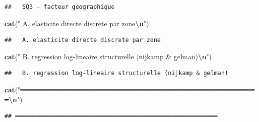 \documentclass[
]{article}
\newenvironment{Shaded}{\begin{snugshade}}{\end{snugshade}}
\newcommand{\FunctionTok}[1]{\textcolor[rgb]{0.13,0.29,0.53}{\textbf{#1}}}
\newcommand{\NormalTok}[1]{#1}
\newcommand{\SpecialCharTok}[1]{\textcolor[rgb]{0.81,0.36,0.00}{\textbf{#1}}}
\newcommand{\StringTok}[1]{\textcolor[rgb]{0.31,0.60,0.02}{#1}}
\begin{document}
\begin{verbatim}
##   SQ3 - facteur geographique
\end{verbatim}

\begin{Shaded}
\begin{Highlighting}[]
\FunctionTok{cat}\NormalTok{(}\StringTok{"  A. elasticite directe discrete par zone}\SpecialCharTok{\textbackslash{}n}\StringTok{"}\NormalTok{)}
\end{Highlighting}
\end{Shaded}

\begin{verbatim}
##   A. elasticite directe discrete par zone
\end{verbatim}

\begin{Shaded}
\begin{Highlighting}[]
\FunctionTok{cat}\NormalTok{(}\StringTok{"  B. regression log{-}lineaire structurelle (nijkamp \& gelman)}\SpecialCharTok{\textbackslash{}n}\StringTok{"}\NormalTok{)}
\end{Highlighting}
\end{Shaded}

\begin{verbatim}
##   B. regression log-lineaire structurelle (nijkamp & gelman)
\end{verbatim}

\begin{Shaded}
\begin{Highlighting}[]
\FunctionTok{cat}\NormalTok{(}\StringTok{"━━━━━━━━━━━━━━━━━━━━━━━━━━━━━━━━━━━━━━━━━━━━━━━━━━━━━━━━━}\SpecialCharTok{\textbackslash{}n}\StringTok{"}\NormalTok{)}
\end{Highlighting}
\end{Shaded}

\begin{verbatim}
## ━━━━━━━━━━━━━━━━━━━━━━━━━━━━━━━━━━━━━━━━━━━━━━━━━━━━━━━━━
\end{verbatim}
\end{document}
